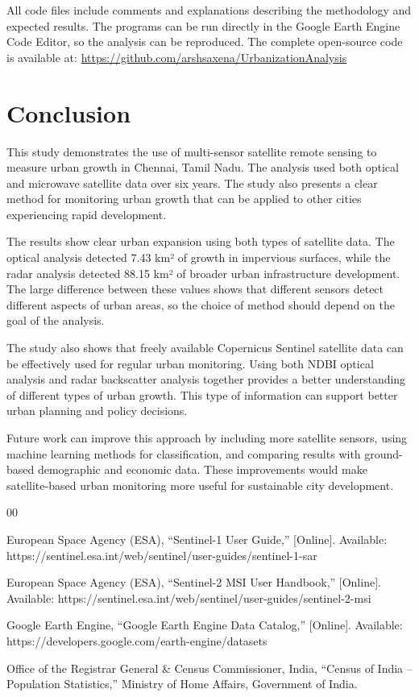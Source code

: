 \documentclass[conference]{IEEEtran}
\begin{document}
All code files include comments and explanations describing the methodology and expected results. The programs can be run directly in the Google Earth Engine Code Editor, so the analysis can be reproduced. The complete open-source code is available at: \url{https://github.com/arshsaxena/UrbanizationAnalysis}

\section{Conclusion}

This study demonstrates the use of multi-sensor satellite remote sensing to measure urban growth in Chennai, Tamil Nadu. The analysis used both optical and microwave satellite data over six years. The study also presents a clear method for monitoring urban growth that can be applied to other cities experiencing rapid development.

The results show clear urban expansion using both types of satellite data. The optical analysis detected 7.43 km² of growth in impervious surfaces, while the radar analysis detected 88.15 km² of broader urban infrastructure development. The large difference between these values shows that different sensors detect different aspects of urban areas, so the choice of method should depend on the goal of the analysis.

The study also shows that freely available Copernicus Sentinel satellite data can be effectively used for regular urban monitoring. Using both NDBI optical analysis and radar backscatter analysis together provides a better understanding of different types of urban growth. This type of information can support better urban planning and policy decisions.

Future work can improve this approach by including more satellite sensors, using machine learning methods for classification, and comparing results with ground-based demographic and economic data. These improvements would make satellite-based urban monitoring more useful for sustainable city development.

\begin{thebibliography}{00}

European Space Agency (ESA), ``Sentinel-1 User Guide,'' [Online]. Available: https://sentinel.esa.int/web/sentinel/user-guides/sentinel-1-sar

European Space Agency (ESA), ``Sentinel-2 MSI User Handbook,'' [Online]. Available: https://sentinel.esa.int/web/sentinel/user-guides/sentinel-2-msi

Google Earth Engine, ``Google Earth Engine Data Catalog,'' [Online]. Available: https://developers.google.com/earth-engine/datasets

Office of the Registrar General \& Census Commissioner, India, ``Census of India – Population Statistics,'' Ministry of Home Affairs, Government of India.

\end{thebibliography}
\end{document}
